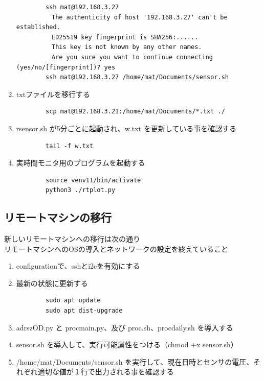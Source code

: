 \documentclass[12pt,a4j]{jsbook}
\begin{document}
\begin{enumerate}
	\begin{verbatim}
		ssh mat@192.168.3.27
		　The authenticity of host '192.168.3.27' can't be established.
		　ED25519 key fingerprint is SHA256:......
		　This key is not known by any other names.
		　Are you sure you want to continue connecting (yes/no/[fingerprint])? yes
		ssh mat@192.168.3.27 /home/mat/Documents/sensor.sh
	\end{verbatim}
	\item txtファイルを移行する
	\begin{verbatim}
		scp mat@192.168.3.21:/home/mat/Documents/*.txt ./
	\end{verbatim}
	\item rsensor.sh が5分ごとに起動され、w.txt を更新している事を確認する
	\begin{verbatim}
		tail -f w.txt
	\end{verbatim}
	\item 実時間モニタ用のプログラムを起動する
	\begin{verbatim}
		source venv11/bin/activate
		python3 ./rtplot.py
	\end{verbatim}
\end{enumerate}

\subsection{リモートマシンの移行}

新しいリモートマシンへの移行は次の通り\\リモートマシンへのOSの導入とネットワークの設定を終えていること

\begin{enumerate}
	\item configurationで、sshとi2cを有効にする
	\item 最新の状態に更新する
	\begin{verbatim}
		sudo apt update
		sudo apt dist-upgrade
	\end{verbatim}
	\item adrszOD.py と procmain.py、及び proc.sh、procdaily.sh を導入する
	\item sensor.sh を導入して、実行可能属性をつける（chmod +x sensor.sh）
	\item /home/mat/Documents/sensor.sh を実行して、現在日時とセンサの電圧、それぞれ適切な値が１行で出力される事を確認する
\end{enumerate}
\end{document}
